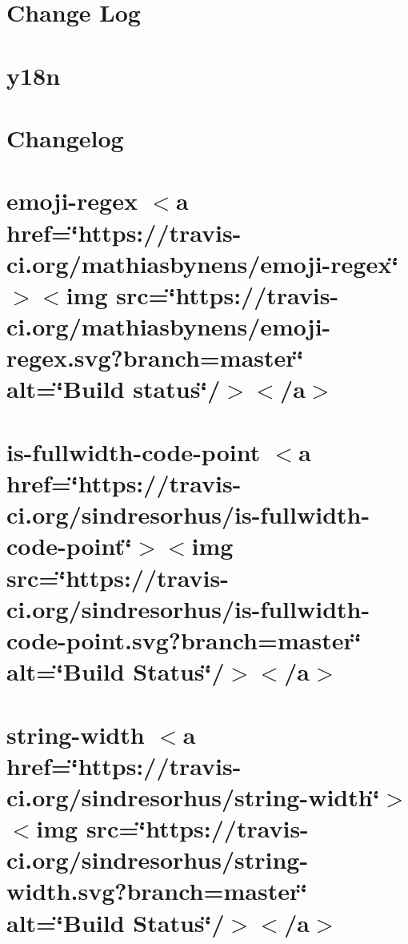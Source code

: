 \let\mypdfximage\pdfximage\def\pdfximage{\immediate\mypdfximage}\documentclass[twoside]{book}
\newcommand{\+}{\discretionary{\mbox{\scriptsize$\hookleftarrow$}}{}{}}
\begin{document}
\chapter{Change Log}
\label{md_heap-visualizer_node_modules_y18n__c_h_a_n_g_e_l_o_g}

\chapter{y18n}
\label{md_heap-visualizer_node_modules_y18n__r_e_a_d_m_e}

\chapter{Changelog}
\label{md_heap-visualizer_node_modules_yargs__c_h_a_n_g_e_l_o_g}

\chapter{emoji-\/regex $<$a href=\char`\"{}https\+://travis-\/ci.\+org/mathiasbynens/emoji-\/regex\char`\"{}$>$$<$img src=\char`\"{}https\+://travis-\/ci.\+org/mathiasbynens/emoji-\/regex.\+svg?branch=master\char`\"{} alt=\char`\"{}\+Build status\char`\"{}/$>$$<$/a$>$}
\label{md_heap-visualizer_node_modules_yargs_node_modules_emoji-regex__r_e_a_d_m_e}

\chapter{is-\/fullwidth-\/code-\/point $<$a href=\char`\"{}https\+://travis-\/ci.\+org/sindresorhus/is-\/fullwidth-\/code-\/point\char`\"{}$>$$<$img src=\char`\"{}https\+://travis-\/ci.\+org/sindresorhus/is-\/fullwidth-\/code-\/point.\+svg?branch=master\char`\"{} alt=\char`\"{}\+Build Status\char`\"{}/$>$$<$/a$>$}
\label{md_heap-visualizer_node_modules_yargs_node_modules_is-fullwidth-code-point_readme}

\chapter{string-\/width $<$a href=\char`\"{}https\+://travis-\/ci.\+org/sindresorhus/string-\/width\char`\"{}$>$$<$img src=\char`\"{}https\+://travis-\/ci.\+org/sindresorhus/string-\/width.\+svg?branch=master\char`\"{} alt=\char`\"{}\+Build Status\char`\"{}/$>$$<$/a$>$}
\label{md_heap-visualizer_node_modules_yargs_node_modules_string-width_readme}

\end{document}
